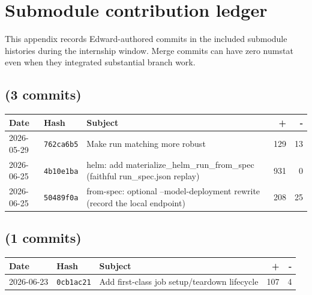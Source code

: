 \chapter{Submodule contribution ledger}\label{app:submodule-ledger}
\small
This appendix records Edward-authored commits in the included submodule histories during the internship window. Merge commits can have zero numstat even when they integrated substantial branch work.
\section*{ (3 commits)}
\begin{longtable}{@{}p{}p{}p{}r r@{}}
\toprule Date & Hash & Subject & + & - \\ \midrule\endhead
2026-05-29 & \texttt{762ca6b5} & Make run matching more robust & 129 & 13 \\
2026-06-25 & \texttt{4b10e1ba} & helm: add materialize\_helm\_run\_from\_spec (faithful run\_spec.json replay) & 931 & 0 \\
2026-06-25 & \texttt{50489f0a} & from-spec: optional --model-deployment rewrite (record the local endpoint) & 208 & 25 \\
\bottomrule\end{longtable}
\section*{ (1 commits)}
\begin{longtable}{@{}p{}p{}p{}r r@{}}
\toprule Date & Hash & Subject & + & - \\ \midrule\endhead
2026-06-23 & \texttt{0cb1ac21} & Add first-class job setup/teardown lifecycle & 107 & 4 \\
\bottomrule\end{longtable}
